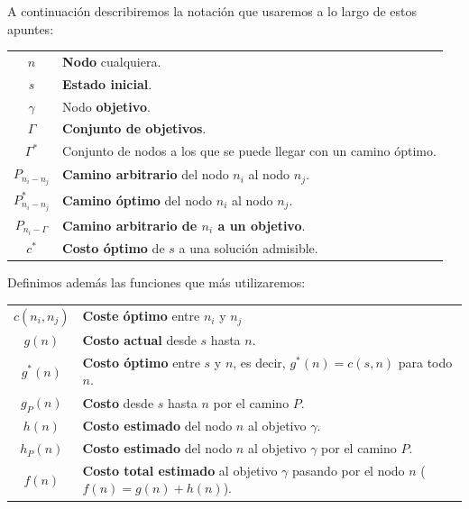 \begin{notacion}
    A continuación describiremos la notación que usaremos a lo largo de estos apuntes:
    \begin{center}
        \begin{tabular}{c | l}
            $n$ & \textbf{Nodo} cualquiera.\\
            $s$ & \textbf{Estado inicial}. \\
            $\gamma$ & Nodo \textbf{objetivo}.\\
            $\Gamma$ & \textbf{Conjunto de objetivos}.\\
            $\Gamma^*$ & Conjunto de nodos a los que se puede llegar con un camino óptimo.\\
            $P_{n_i-n_j}$ & \textbf{Camino arbitrario} del nodo $n_i$ al nodo $n_j$.\\
            $P^*_{n_i-n_j}$ & \textbf{Camino óptimo} del nodo $n_i$ al nodo $n_j$.\\
            $P_{n_i-\Gamma}$ & \textbf{Camino arbitrario de $n_i$ a un objetivo}.\\
            $c^*$ & \textbf{Costo óptimo} de $s$ a una solución admisible.
        \end{tabular}
    \end{center}
    Definimos además las funciones que más utilizaremos:
    \begin{center}%
        \begin{tabular}{c | l}%
            $c(n_i, n_j)$ & \textbf{Coste óptimo} entre $n_i$ y $n_j$ \\
            $g(n)$ & \textbf{Costo actual} desde $s$ hasta $n$.\\
            $g^*(n)$ & \textbf{Costo óptimo} entre $s$ y $n$, es decir, $g^*(n) = c(s,n)$ para todo $n$.\\
            $g_P(n)$ & \textbf{Costo} desde $s$ hasta $n$ por el camino $P$.\\
            $h(n)$ & \textbf{Costo estimado} del nodo $n$ al objetivo $\gamma$.\\
            $h_P(n)$ & \textbf{Costo estimado} del nodo $n$ al objetivo $   \gamma$ por el camino $P$.\\
            $f(n)$ & \textbf{Costo total estimado} al objetivo $\gamma$ pasando por el nodo $n$ ($f(n)=g(n)+h(n)$).
        \end{tabular}
    \end{center}
\end{notacion}

